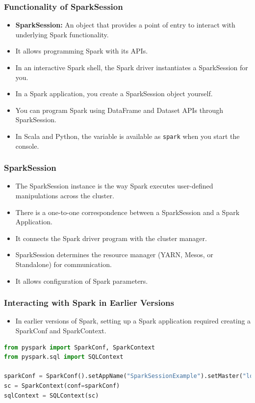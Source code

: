 \begin{frame}
    \frametitle{Functionality of SparkSession}

    \begin{itemize}
        \item \textbf{SparkSession:} An object that provides a point of entry to interact with underlying Spark functionality.
        \item It allows programming Spark with its APIs.
        \item In an interactive Spark shell, the Spark driver instantiates a SparkSession for you.
        \item In a Spark application, you create a SparkSession object yourself.
        \item You can program Spark using DataFrame and Dataset APIs through SparkSession.
        \item In Scala and Python, the variable is available as \texttt{spark} when you start the console.

    \end{itemize}
\end{frame}

\begin{frame}
    \frametitle{SparkSession}
    \begin{itemize}
        \item The SparkSession instance is the way Spark executes user-defined manipulations across the cluster.
        \item There is a one-to-one correspondence between a SparkSession and a Spark Application.
        \item It connects the Spark driver program with the cluster manager.
        \item SparkSession determines the resource manager (YARN, Mesos, or Standalone) for communication.
        \item It allows configuration of Spark parameters.
    \end{itemize}
\end{frame}


\begin{frame}[fragile]
    \frametitle{Interacting with Spark in Earlier Versions}

    \begin{itemize}
        \item In earlier versions of Spark, setting up a Spark application required creating a SparkConf and SparkContext.
    \end{itemize}

    \begin{lstlisting}[language=Python,label={lst:pyspark-spark-context},caption={Create SparkContext in old Spark versions}]
from pyspark import SparkConf, SparkContext
from pyspark.sql import SQLContext

sparkConf = SparkConf().setAppName("SparkSessionExample").setMaster("local")
sc = SparkContext(conf=sparkConf)
sqlContext = SQLContext(sc)
    \end{lstlisting}

\end{frame}



